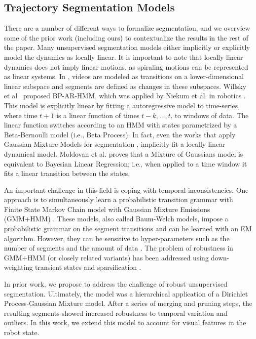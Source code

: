 \subsection{Trajectory Segmentation Models}
There are a number of different ways to formalize segmentation, and we overview some of the prior work (including ours) to contextualize the results in the rest of the paper.
Many unsupervised segmentation models either implicitly or explicitly model the dynamics as locally linear.
It is important to note that locally linear dynamics does not imply linear motions, as spiraling motions can be represented as linear systems. 
In \cite{elhamifar2009sparse}, videos are modeled as transitions on a lower-dimensional linear subspace and segments are defined as changes in these subspaces.
Willsky et al~\cite{willsky2009sharing} proposed BP-AR-HMM, which was applied by Niekum et al. in robotics \cite{niekum2012learning}.
This model is explicitly linear by fitting a autoregressive model to time-series, where time $t+1$ is a linear function of times $t-k,\ldots, t$, to windows of data. 
The linear function switches according to an HMM with states parametrized by a Beta-Bernoulli model (i.e., Beta Process). 
In fact, even the works that apply Gaussian Mixture Models for segmentation \cite{calinon2010learning, lee2015autonomous, kruger2012imitation}, implicitly fit a locally linear dynamical model.
Moldovan et al. \cite{moldovan2013dirichlet} proves that a Mixture of Gaussians model is equivalent to Bayesian Linear Regression; i.e., when applied to a time window it fits a linear transition between the states.

An important challenge in this field is coping with temporal inconsistencies.
One approach is to simultaneously learn a probabilistic transition grammar with Finite State Markov Chain model with Gaussian Mixture Emissions (GMM+HMM) \cite{asfour2006imitation,calinon2004stochastic,kruger2010learning, vakanski2012trajectory}.
These models, also called Baum-Welch models, impose a probabilistic grammar on the segment transitions and can be learned with an EM algorithm.
However, they can be sensitive to hyper-parameters such as the number of segments and the amount of data \cite{tang2010toward}.
The problem of robustness in GMM+HMM (or closely related variants) has been addressed using down-weighting transient states \cite{kulic2008scaffolding} and sparsification \cite{grollman2010incremental}.

In prior work, we propose \sys to address the challenge of robust unsupervised segmentation.
Ultimately, the model was a hierarchical application of a Dirichlet Process-Gaussian Mixture model.
After a series of merging and pruning steps, the resulting segments showed increased robustness to temporal variation and outliers.
In this work, we extend this model to account for visual features in the robot state.


